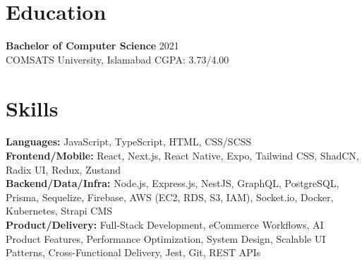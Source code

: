 \documentclass[9pt,letterpaper]{article}
\begin{document}
\section*{Education}
\textbf{Bachelor of Computer Science} \hfill 2021 \\
COMSATS University, Islamabad \hfill CGPA: 3.73/4.00

\section*{Skills}
\textbf{Languages:} JavaScript, TypeScript, HTML, CSS/SCSS \\
\textbf{Frontend/Mobile:} React, Next.js, React Native, Expo, Tailwind CSS, ShadCN, Radix UI, Redux, Zustand \\
\textbf{Backend/Data/Infra:} Node.js, Express.js, NestJS, GraphQL, PostgreSQL, Prisma, Sequelize, Firebase, AWS (EC2, RDS, S3, IAM), Socket.io, Docker, Kubernetes, Strapi CMS \\
\textbf{Product/Delivery:} Full-Stack Development, eCommerce Workflows, AI Product Features, Performance Optimization, System Design, Scalable UI Patterns, Cross-Functional Delivery, Jest, Git, REST APIs
\end{document}
